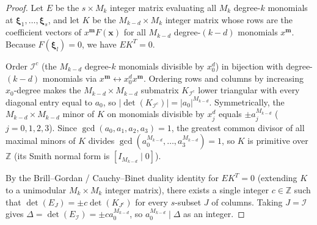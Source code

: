 \documentclass[11pt,a4paper]{amsart}
\theoremstyle{plain}
\theoremstyle{definition}
\theoremstyle{remark}
\newcommand{\Z}{\mathbb{Z}}
\begin{document}
\begin{proof}
Let $E$ be the $s \times M_k$ integer matrix evaluating all $M_k$ degree-$k$ monomials at $\boldsymbol{\xi}_1,\dots,\boldsymbol{\xi}_s$, and let $K$ be the $M_{k-d} \times M_k$ integer matrix whose rows are the coefficient vectors of $x^{\mathbf{m}} F(\mathbf{x})$ for all $M_{k-d}$ degree-$(k-d)$ monomials $x^{\mathbf{m}}$. Because $F(\boldsymbol{\xi}_l) = 0$, we have $E K^T = 0$.

Order $\mathcal{I}^c$ (the $M_{k-d}$ degree-$k$ monomials divisible by $x_0^d$) in bijection with degree-$(k-d)$ monomials via $x^{\mathbf{m}} \leftrightarrow x_0^d x^{\mathbf{m}}$. Ordering rows and columns by increasing $x_0$-degree makes the $M_{k-d} \times M_{k-d}$ submatrix $K_{\mathcal{I}^c}$ lower triangular with every diagonal entry equal to $a_0$, so $|\det(K_{\mathcal{I}^c})| = |a_0|^{M_{k-d}}$. Symmetrically, the $M_{k-d} \times M_{k-d}$ minor of $K$ on monomials divisible by $x_j^d$ equals $\pm a_j^{M_{k-d}}$ ($j = 0,1,2,3$). Since $\gcd(a_0,a_1,a_2,a_3) = 1$, the greatest common divisor of all maximal minors of $K$ divides $\gcd(a_0^{M_{k-d}},\dots,a_3^{M_{k-d}}) = 1$, so $K$ is primitive over $\Z$ (its Smith normal form is $[I_{M_{k-d}} \mid 0]$).

By the Brill--Gordan / Cauchy--Binet duality identity for $E K^T = 0$ (extending $K$ to a unimodular $M_k \times M_k$ integer matrix), there exists a single integer $c \in \Z$ such that $\det(E_J) = \pm c \det(K_{J^c})$ for every $s$-subset $J$ of columns. Taking $J = \mathcal{I}$ gives $\Delta = \det(E_{\mathcal{I}}) = \pm c a_0^{M_{k-d}}$, so $a_0^{M_{k-d}} \mid \Delta$ as an integer.


\end{proof}
\end{document}
